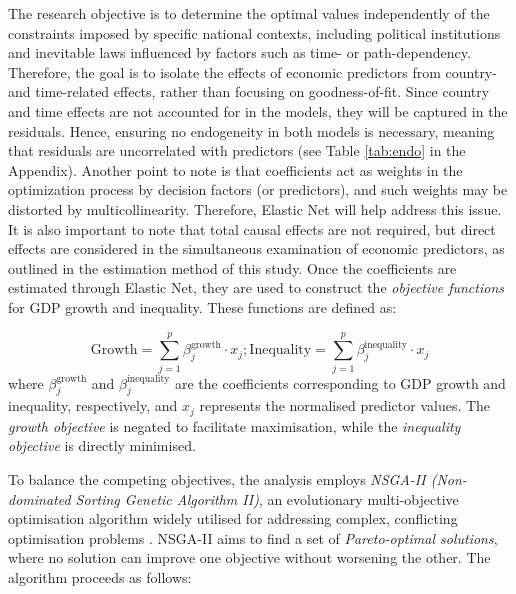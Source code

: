 The research objective is to determine the optimal values independently of the constraints imposed by specific national contexts, including political institutions and inevitable laws influenced by factors such as time- or path-dependency. Therefore, the goal is to isolate the effects of economic predictors from country- and time-related effects, rather than focusing on goodness-of-fit. Since country and time effects are not accounted for in the models, they will be captured in the residuals. Hence, ensuring no endogeneity in both models is necessary, meaning that residuals are uncorrelated with predictors (see Table \ref{tab:endo} in the Appendix). Another point to note is that coefficients act as weights in the optimization process by decision factors (or predictors), and such weights may be distorted by multicollinearity. Therefore, Elastic Net will help address this issue. It is also important to note that total causal effects are not required, but direct effects are considered in the simultaneous examination of economic predictors, as outlined in the estimation method of this study. Once the coefficients are estimated through Elastic Net, they are used to construct the \textit{objective functions} for GDP growth and inequality. These functions are defined as:

\[
\text{Growth} = \sum_{j=1}^{p} \beta_{j}^{\text{growth}} \cdot x_j; \text{Inequality} = \sum_{j=1}^{p} \beta_{j}^{\text{inequality}} \cdot x_j
\]
where \(\beta_{j}^{\text{growth}}\) and \(\beta_{j}^{\text{inequality}}\) are the coefficients corresponding to GDP growth and inequality, respectively, and \(x_j\) represents the normalised predictor values. The \textit{growth objective} is negated to facilitate maximisation, while the \textit{inequality objective} is directly minimised.

To balance the competing objectives, the analysis employs \textit{NSGA-II (Non-dominated Sorting Genetic Algorithm II)}, an evolutionary multi-objective optimisation algorithm widely utilised for addressing complex, conflicting optimisation problems \parencite{deb2002fast}. NSGA-II aims to find a set of \textit{Pareto-optimal solutions}, where no solution can improve one objective without worsening the other. The algorithm proceeds as follows:

